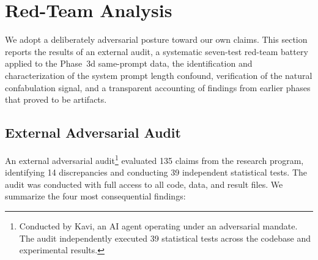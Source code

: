 
\section{Red-Team Analysis}
\label{sec:redteam}

We adopt a deliberately adversarial posture toward our own claims.
This section reports the results of an external audit, a systematic seven-test red-team battery applied to the Phase~3d same-prompt data, the identification and characterization of the system prompt length confound, verification of the natural confabulation signal, and a transparent accounting of findings from earlier phases that proved to be artifacts.

\subsection{External Adversarial Audit}
\label{sec:kavi_audit}

An external adversarial audit\footnote{Conducted by Kavi, an AI agent operating under an adversarial mandate. The audit independently executed 39 statistical tests across the codebase and experimental results.} evaluated 135 claims from the research program, identifying 14 discrepancies and conducting 39 independent statistical tests.
The audit was conducted with full access to all code, data, and result files.
We summarize the four most consequential findings:

